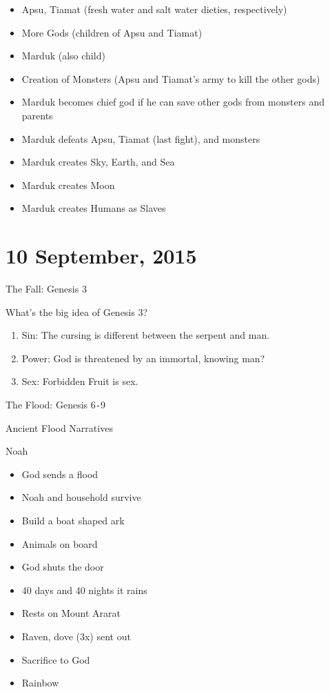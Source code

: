 \documentclass{article}
\begin{document}
    \begin{itemize}
        \item Apsu, Tiamat (fresh water and salt water dieties, respectively)
        \item More Gods (children of Apsu and Tiamat)
        \item Marduk (also child)
        \item Creation of Monsters (Apsu and Tiamat's army to kill the other gods)
        \item Marduk becomes chief god if he can save other gods from monsters and parents
        \item Marduk defeats Apsu, Tiamat (last fight), and monsters
        \item Marduk creates Sky, Earth, and Sea
        \item Marduk creates Moon
        \item Marduk creates Humans as Slaves
    \end{itemize}

\section{10 September, 2015}

\centerline{The Fall: Genesis 3}

    What's the big idea of Genesis 3?

    \begin{enumerate}
        \item Sin: The cursing is different between the serpent and man.
        \item Power: God is threatened by an immortal, knowing man?
        \item Sex: Forbidden Fruit is sex.
    \end{enumerate}

    \centerline{The Flood: Genesis 6\texttt{-}9}

    Ancient Flood Narratives

    Noah

    \begin{itemize}
        \item God sends a flood
        \item Noah and household survive
        \item Build a boat shaped ark
        \item Animals on board
        \item God shuts the door
        \item 40 days and 40 nights it rains
        \item Rests on Mount Ararat
        \item Raven, dove (3x) sent out
        \item Sacrifice to God
        \item Rainbow
    \end{itemize}
\end{document}
